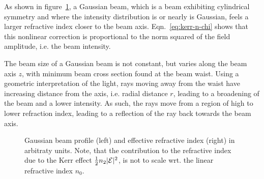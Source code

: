 As shown in figure~\ref{fig:kerr-refrac}, a Gaussian beam, which is a
beam exhibiting cylindrical symmetry and where the intensity
distribution is or nearly is Gaussian, feels a larger refractive index
closer to the beam axis. Eqn.~\eqref{eq:kerr-n-chi} shows that this
nonlinear correction is proportional to the norm squared of the field
amplitude, i.e. the beam intensity.

The beam size of a Gaussian beam is not constant, but varies along
the beam axis $z$, with minimum beam cross section found at the beam
waist. Using a geometric interpretation of the light, rays moving away
from the waist have increasing distance from the axis, i.e. radial
distance $r$, leading to a broadening of the beam and a lower
intensity. As such, the rays move from a region of high to lower
refraction index, leading to a reflection of the ray back towards the
beam axis.

\begin{figure}[t!]
  \newenvironment{gaussaxis}[2][]{%
    \begin{axis}[
      domain=-10:10,
      samples=100,
      ymax=.3,
      height=5cm,
      axis lines=middle,
      axis line style={-latex},
      every axis x label/.style={
        at=(current axis.right of origin),
        anchor=west
      },
      xlabel=$r$,
      ylabel=#2,
      xtick=\empty,
      ytick=\empty,
      clip=false,
      #1]}{\end{axis}}
  \begin{minipage}[t]{.5\linewidth}
    \centering
    \vspace*{0pt}
  \end{minipage}%
  \begin{minipage}[t]{.5\linewidth}
    \vspace*{0pt}
  \end{minipage}
  \caption{Gaussian beam profile (left) and effective refractive index
    (right) in arbitraty units. Note, that the contribution to the
    refractive index due to the Kerr effect $\frac{1}{2} n_2
    |\mathcal{E}|^2$, is not to scale wrt. the linear refractive index
    $n_0$.}
  \label{fig:kerr-refrac}
\end{figure}

